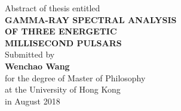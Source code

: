 \documentclass[12pt]{report}
\begin{document}
\begin{center}
  \vspace*{3cm}

    Abstract of thesis entitled \\[1.2cm]
    \Large \textbf{GAMMA-RAY SPECTRAL ANALYSIS 
    \\[0.5cm] OF THREE ENERGETIC \\ [0.5cm] 
    MILLISECOND PULSARS \\[0.5cm]}
    \normalsize Submitted by \\ [0.5cm]
    \Large \textbf{Wenchao Wang} \\[1cm]
    \normalsize for the degree of Master of Philosophy \\[0.5cm]
    at the University of Hong Kong \\[0.5cm]
    in August 2018 \\[1.9cm]
  \end{center}
\end{document}
